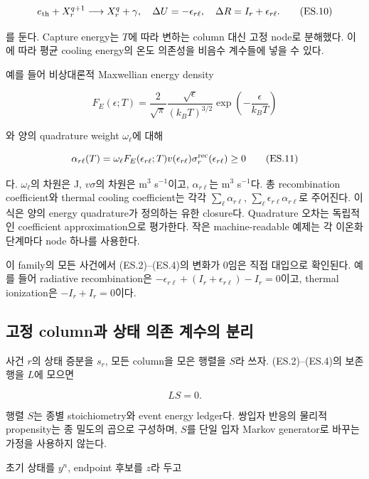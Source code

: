 \documentclass[11pt,a4paper]{article}
\begin{document}
\[
e_{\rm th}+X_r^{q+1}
\longrightarrow X_r^q+\gamma,
\quad
\Delta U=-\epsilon_{r\ell},
\quad
\Delta R=I_r+\epsilon_{r\ell}.
\tag{ES.10}
\]

를 둔다. Capture energy는 \(T\)에 따라 변하는 column 대신 고정 node로 분해했다. 이에 따라 평균 cooling energy의 온도 의존성을 비음수 계수들에 넣을 수 있다.

예를 들어 비상대론적 Maxwellian energy density

\[
F_E(\epsilon;T)=
\frac{2}{\sqrt\pi}
\frac{\sqrt{\epsilon}}{(k_BT)^{3/2}}
\exp\!\left(-\frac{\epsilon}{k_BT}\right)
\]

와 양의 quadrature weight \(\omega_\ell\)에 대해

\[
\alpha_{r\ell}(T)=
\omega_\ell F_E(\epsilon_{r\ell};T)
v(\epsilon_{r\ell})\sigma_r^{\rm rec}(\epsilon_{r\ell})
\ge0
\tag{ES.11}
\]

다. \(\omega_\ell\)의 차원은 J, \(v\sigma\)의 차원은 m\(^3\) s\(^{-1}\)이고, \(\alpha_{r\ell}\)는 m\(^3\) s\(^{-1}\)다. 총 recombination coefficient와 thermal cooling coefficient는 각각 \(\sum_\ell\alpha_{r\ell}\), \(\sum_\ell\epsilon_{r\ell}\alpha_{r\ell}\)로 주어진다. 이 식은 양의 energy quadrature가 정의하는 유한 closure다. Quadrature 오차는 독립적인 coefficient approximation으로 평가한다. 작은 machine-readable 예제는 각 이온화 단계마다 node 하나를 사용한다.

이 family의 모든 사건에서 (ES.2)--(ES.4)의 변화가 0임은 직접 대입으로 확인된다. 예를 들어 radiative recombination은 \(-\epsilon_{r\ell}+(I_r+\epsilon_{r\ell})-I_r=0\)이고, thermal ionization은 \(-I_r+I_r=0\)이다.

\hypertarget{uxace0uxc815-columnuxacfc-uxc0c1uxd0dc-uxc758uxc874-uxacc4uxc218uxc758-uxbd84uxb9ac}{%
\subsection{고정 column과 상태 의존 계수의 분리}\label{uxace0uxc815-columnuxacfc-uxc0c1uxd0dc-uxc758uxc874-uxacc4uxc218uxc758-uxbd84uxb9ac}}

사건 \(r\)의 상태 증분을 \(s_r\), 모든 column을 모은 행렬을 \(S\)라 쓰자. (ES.2)--(ES.4)의 보존 행을 \(L\)에 모으면

\[
LS=0.
\tag{ES.12}
\]

행렬 \(S\)는 종별 stoichiometry와 event energy ledger다. 쌍입자 반응의 물리적 propensity는 종 밀도의 곱으로 구성하며, \(S\)를 단일 입자 Markov generator로 바꾸는 가정을 사용하지 않는다.

초기 상태를 \(y^n\), endpoint 후보를 \(z\)라 두고
\end{document}
